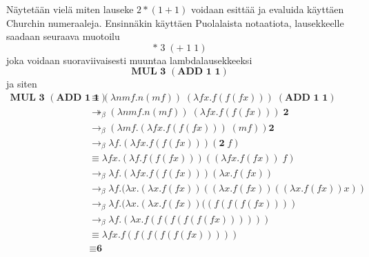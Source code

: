\begin{esim}
Näytetään vielä miten lauseke $2 * (1+1)$ voidaan esittää ja evaluida käyttäen Churchin numeraaleja. Ensinnäkin käyttäen Puolalaista notaatiota, lausekkeelle saadaan seuraava muotoilu
\[* \; 3 \; (+ \; 1 \; 1) \] 
joka voidaan suoraviivaisesti muuntaa lambdalausekkeeksi
\[ \textbf{MUL 3 }(\textbf{ADD 1 1}) \]
ja siten
\begin{align*}
\textbf{MUL 3 }(\textbf{ADD 1 1}) &\equiv (\lambda n m f . n (mf))  \; (\lambda f x . f(f(fx))) \;(\textbf{ADD 1 1}) \\
&\twoheadrightarrow_{\beta} (\lambda n m f . n (mf) ) \; (\lambda f x . f(f(fx))) \; \textbf{2} \\
&\rightarrow_{\beta} (\lambda m f . (\lambda f x . f(f(fx))) \; (m f)) \textbf{2}    \\
&\rightarrow_{\beta} \lambda f . (\lambda f x . f(f(fx))) (\textbf{2} \; f) \\
&\equiv \lambda f x . (\lambda f . f(f(fx))) ((\lambda f x . f (f x)) \; f) \\
&\rightarrow_{\beta} \lambda f . (\lambda f x .  f(f(fx))) (\lambda x . f (f x)) \\
&\rightarrow_{\beta} \lambda f . (\lambda x .  (\lambda x . f (f x))((\lambda x . f (f x))((\lambda x . f (f x))x))\\
&\rightarrow_{\beta} \lambda f . (\lambda x .  (\lambda x . f (f x))((f (f( f( f x))))  \\
&\rightarrow_{\beta} \lambda f . (\lambda x . f( f (f (f( f( f x)))))) \\
&\equiv \lambda f x. f( f (f (f( f( f x))))) \\
&\equiv \textbf{6}
\end{align*} 
\end{esim}   
   